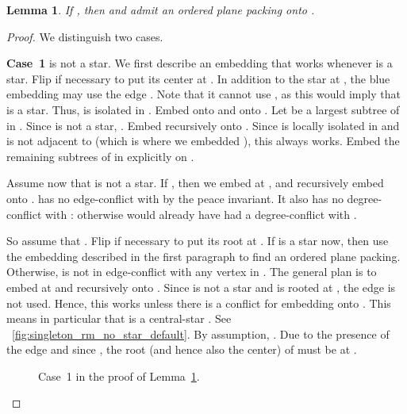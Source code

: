 \documentclass[11pt,a4paper,colorlinks=true,urlcolor=blue,citecolor=red]{article}
\theoremstyle{plain}
\newtheorem{lemma}[theorem]{Lemma}
\newcommand{\case}[1]{\par\vspace{.5\baselineskip}\noindent\textbf{\sffamily Case~#1}}
\begin{document}
\begin{lemma}\label{lem:rec_singleton}
  If , then  and  admit an ordered plane packing onto
  .
\end{lemma}
\begin{proof}
  We distinguish two cases.

  \case{1}  is not a star. We first describe an embedding that
  works whenever  is a star. Flip  if necessary to
  put its center at . In addition to the star at , the
  blue embedding may use the edge . Note that it cannot use
  , as this would imply that  is a star. Thus,  is
  isolated in . Embed  onto  and  onto . Let 
  be a largest subtree of  in . Since  is not a star,
  . Embed  recursively onto . Since  is
  locally isolated in  and  is not adjacent to 
  (which is where we embedded ), this always works. Embed the
  remaining subtrees of  in  explicitly on .

  Assume now that  is not a star.
  If , then we embed  at , and recursively
  embed  onto .
 has no edge-conflict with  by the peace invariant.
  It also has no degree-conflict with :
  otherwise  would already have had a degree-conflict with .

  So assume that . Flip  if necessary to put
  its root at . If  is a star now, then use the embedding
  described in the first paragraph to find an ordered plane packing.
  Otherwise,  is not in edge-conflict with any vertex in .
  The general plan is to embed  at  and  recursively onto
  . Since  is not a star and  is rooted at , the edge
   is not used. Hence, this works unless there is a
  conflict for embedding  onto . This means in
  particular that  is a central-star
  . See
  \figurename~\ref{fig:singleton_rm_no_star_default}. By assumption,
  . Due to the presence of the edge  and
  since , the root (and hence also the center) of  must
  be at .

  \begin{figure}[b]
    \centering\hfil {}\hfil {}\hfil {}\hfil {}\hfil \caption{Case~1 in the proof of Lemma~\ref{lem:rec_singleton}.}
  \end{figure}


\end{proof}
\end{document}
